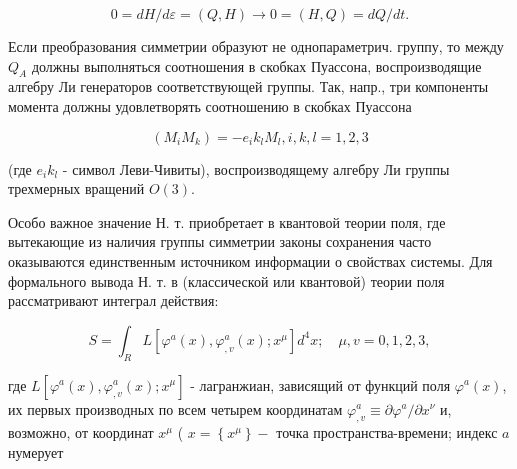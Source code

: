 \documentclass[10pt]{article}
\begin{document}
\[

0=d H / d \varepsilon=(Q, H) \rightarrow 0=(H, Q)=d Q / d t .

\]



Если преобразования симметрии образуют не однопараметрич. группу, то между $Q_{A}$ должны выполняться соотношения в скобках Пуассона, воспроизводящие алгебру Ли генераторов соответствующей группы. Так, напр., три компоненты момента должны удовлетворять соотношению в скобках Пуассона



\[

\left(M_{i} M_{k}\right)=-e_{i} k_{l} M_{l}, i, k, l=1,2,3

\]



(где $e_{i} k_{l}$ - символ Леви-Чивиты), воспроизводящему алгебру Ли группы трехмерных вращений $O(3)$.



Особо важное значение Н. т. приобретает в квантовой теории поля, где вытекающие из наличия группы симметрии законы сохранения часто оказываются единственным источником информации о свойствах системы. Для формального вывода Н. т. в (классической или квантовой) теории поля рассматривают интеграл действия:



\[

S=\int_{R} L\left[\varphi^{a}(x), \varphi_{, v}^{a}(x) ; x^{\mu}\right] d^{4} x ; \quad \mu, v=0,1,2,3,

\]



где $L\left[\varphi^{a}(x), \varphi_{, v}^{a}(x) ; x^{\mu}\right]$ - лагранжиан, зависящий от функций поля $\varphi^{a}(x)$, их первых производных по всем четырем координатам $\varphi_{, v}^{a} \equiv \partial \varphi^{a} / \partial x^{\nu}$ и, возможно, от координат $x^{\mu}$ ( $x=\left\{x^{\mu}\right\}-$ точка пространства-времени; индекс $a$ нумерует
\end{document}

